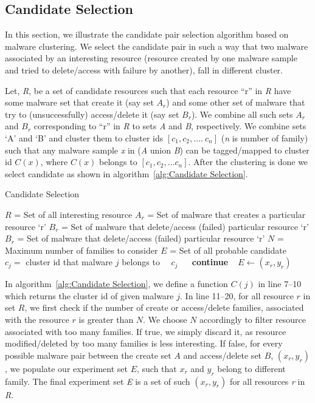 \subsection{Candidate Selection}
\label{sub:Candidate Selection}
In this section, we illustrate the candidate pair selection algorithm based on malware clustering.
We select the candidate pair in such a way that two malware associated by an interesting resource (resource created by one malware sample and tried to delete/access with failure by another), fall in different cluster.

Let, \emph{R}, be a set of candidate resources such that each resource ``r'' in \emph{R} have some malware set that create it (say set $A_r$) and some other set of malware that try to (unsuccessfully) access/delete it (say set $B_r$).
We combine all such sets $A_r$ and $B_r$ corresponding to ``r'' in \emph{R} to sets \emph{A} and \emph{B}, respectively.
We combine sets `A' and `B' and cluster them to cluster ids $[c_1,c_2,\ldots.\ c_n]$ (\emph{n} is number of family) such that any malware sample \emph{x} in (\emph{A} union \emph{B}) can be tagged/mapped to cluster id $C(x)$, where $C(x)$ belongs to $[c_1, c_2, \ldots c_n]$.
After the clustering is done we select candidate as shown in algorithm~\autoref{alg:Candidate Selection}.
\begin{algorithm}[ht]
\caption{Candidate Selection}
\label{alg:Candidate Selection}
\begin{algorithmic}[1]
    \State$R$   = Set of all interesting resource
    \State$A_r$ = Set of malware that creates a particular resource `r'
    \State$B_r$ = Set of malware that delete/access (failed) particular resource `r'
    \State$B_r$ = Set of malware that delete/access (failed) particular resource `r'
    \State$N$   = Maximum number of families to consider
    \State$E$   = Set of all probable candidate
      \State\ $c_j =$ cluster id that malware $j$ belongs to
      \State\ \Return\ $c_j$
    \EndFunction\
        \State\ \textbf{continue}
      \EndIf\
          \State$E\gets (x_r, y_r)$
        \EndIf\
      \EndFor\
    \EndFor\
  \end{algorithmic}
\end{algorithm}

In algorithm~\autoref{alg:Candidate Selection}, we define a function $C(j)$ in line 7--10 which returns the cluster id of given malware $j$.
In line 11--20, for all resource $r$ in set $R$, we first check if the number of create or access/delete families, associated with the resource $r$ is greater than $N$.
We choose $N$ accordingly to filter resource associated with too many families.
If true, we simply discard it, as resource modified/deleted by too many families is less interesting.
If false, for every possible malware pair between the create set $A$ and access/delete set $B$, $(x_r,y_r)$, we populate our experiment set $E$, such that $x_r$ and $y_r$ belong to different family.
The final experiment set \emph{E} is a set of such $(x_r, y_r)$ for all resources \emph{r} in \emph{R}.

